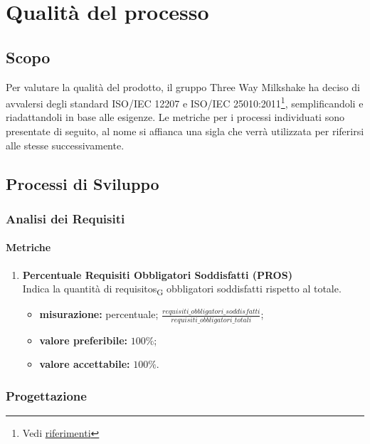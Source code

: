 \section{Qualità del processo}

\subsection{Scopo}
Per valutare  la qualità del prodotto, il gruppo Three Way Milkshake ha deciso di avvalersi degli standard ISO/IEC 12207 e ISO/IEC 25010:2011\footnote{Vedi \hyperref[ref]{riferimenti}}, semplificandoli e riadattandoli in base alle esigenze. Le metriche per i processi individuati sono presentate di seguito, al nome si affianca una sigla che verrà utilizzata per riferirsi alle stesse successivamente.

\subsection{Processi di Sviluppo}

\subsubsection{Analisi dei Requisiti}
\paragraph{Metriche}
\begin{enumerate}
	\item []
	      \textbf{Percentuale Requisiti Obbligatori Soddisfatti (PROS)}\\
	      Indica la quantità di \glspl{requisito}\textsubscript{G} obbligatori soddisfatti rispetto al totale.
	      \begin{itemize}
		      \item \textbf{misurazione:} percentuale; $\frac{requisiti\_obbligatori\_soddisfatti}{requisiti\_obbligatori\_totali}$;
		      \item \textbf{valore preferibile:} $100\%$;
		      \item \textbf{valore accettabile:} $100\%$.
	      \end{itemize}
\end{enumerate}
\subsubsection{Progettazione}
